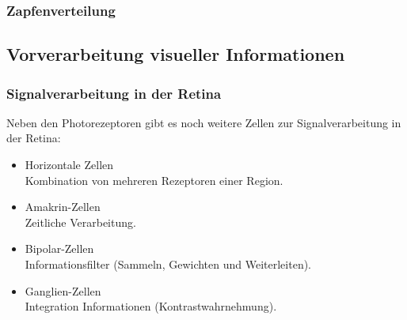 			\subsubsection{Zapfenverteilung} %

		\subsection{Vorverarbeitung visueller Informationen}
			\subsubsection{Signalverarbeitung in der Retina}
				Neben den Photorezeptoren gibt es noch weitere Zellen zur Signalverarbeitung in der Retina:
				\begin{itemize}
					\item Horizontale Zellen \\ Kombination von mehreren Rezeptoren einer Region.
					\item Amakrin-Zellen \\ Zeitliche Verarbeitung.
					\item Bipolar-Zellen \\ Informationsfilter (Sammeln, Gewichten und Weiterleiten).
					\item Ganglien-Zellen \\ Integration Informationen (\zB Kontrastwahrnehmung).
				\end{itemize}

